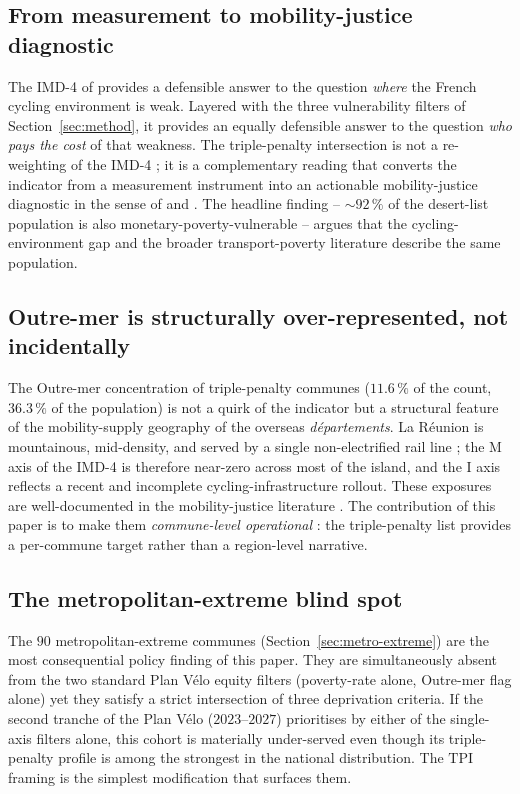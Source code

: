 \documentclass[11pt,a4paper]{article}
\newcommand{\TPI}{\mathrm{TPI}}
\begin{document}
\subsection{From measurement to mobility-justice diagnostic}

The IMD-4 of \citet{Fosse2026imd_national} provides a defensible
answer to the question \emph{where} the French cycling environment
is weak.  Layered with the three vulnerability filters of
Section~\ref{sec:method}, it provides an equally defensible answer
to the question \emph{who pays the cost} of that weakness.  The
triple-penalty intersection is not a re-weighting of the IMD-4 ;
it is a complementary reading that converts the indicator from a
measurement instrument into an actionable mobility-justice
diagnostic in the sense of
\citet{Pereira2017} and \citet{Verlinghieri2020}.  The headline
finding -- $\sim 92\,\%$ of the desert-list population is also
monetary-poverty-vulnerable -- argues that the cycling-environment
gap and the broader transport-poverty literature describe the
same population.

\subsection{Outre-mer is structurally over-represented, not
incidentally}

The Outre-mer concentration of triple-penalty communes
($11.6\,\%$ of the count, $36.3\,\%$ of the population) is not a
quirk of the indicator but a structural feature of the
mobility-supply geography of the overseas \emph{d\'epartements}.
La R\'eunion is mountainous, mid-density, and served by a single
non-electrified rail line ; the M axis of the IMD-4 is therefore
near-zero across most of the island, and the I axis reflects a
recent and incomplete cycling-infrastructure rollout.  These
exposures are well-documented in the mobility-justice literature
\citep{Sheller2018}.  The contribution of this paper is to make
them \emph{commune-level operational} : the triple-penalty list
provides a per-commune target rather than a region-level
narrative.

\subsection{The metropolitan-extreme blind spot}

The $90$ metropolitan-extreme communes
(Section~\ref{sec:metro-extreme}) are the most consequential
policy finding of this paper.  They are simultaneously absent
from the two standard Plan V\'elo equity filters (poverty-rate
alone, Outre-mer flag alone) yet they satisfy a strict
intersection of three deprivation criteria.  If the second tranche
of the Plan V\'elo ($2023$--$2027$) prioritises by either of the
single-axis filters alone, this cohort is materially under-served
even though its triple-penalty profile is among the strongest in
the national distribution.  The $\TPI$ framing is the simplest
modification that surfaces them.
\end{document}
